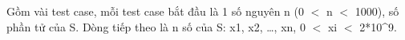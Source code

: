 Gồm vài test case, mỗi test case bắt đầu là 1 số nguyên n (0 $<$  n $<$ 1000),  số phần tử của S. Dòng tiếp theo là n số của S: x1, x2, …, xn,  0 $<$ xi $<$ 2*10^9.